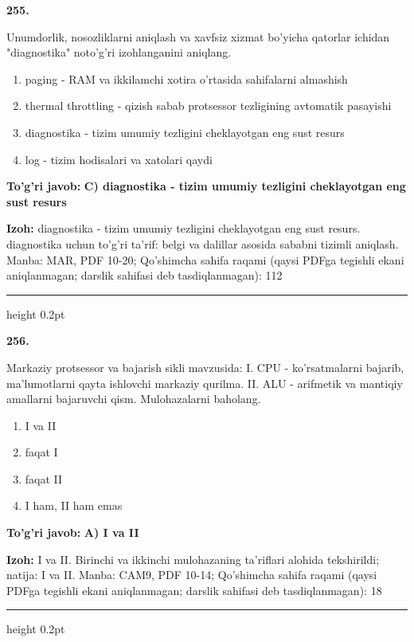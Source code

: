 \documentclass[10pt,a4paper]{article}
\begin{document}
{\bfseries\sffamily\color{ink} 255.}
\par
Unumdorlik, nosozliklarni aniqlash va xavfsiz xizmat bo'yicha qatorlar ichidan "diagnostika" noto'g'ri izohlanganini aniqlang.
\begin{enumerate}[label=\Alph*),leftmargin=9mm]
\item paging - RAM va ikkilamchi xotira o'rtasida sahifalarni almashish
\item thermal throttling - qizish sabab protsessor tezligining avtomatik pasayishi
\item diagnostika - tizim umumiy tezligini cheklayotgan eng sust resurs
\item log - tizim hodisalari va xatolari qaydi
\end{enumerate}
\begin{tcolorbox}[enhanced,breakable,colback=teal!4,colframe=teal!60!black,boxrule=0.45pt,arc=1.2mm,left=2.7mm,right=2.7mm,top=1.8mm,bottom=1.8mm,before skip=2mm,after skip=2mm]
{\bfseries\sffamily\color{teal}To'g'ri javob:} \textbf{C) diagnostika - tizim umumiy tezligini cheklayotgan eng sust resurs}
\par\smallskip
{\bfseries Izoh:} diagnostika - tizim umumiy tezligini cheklayotgan eng sust resurs. diagnostika uchun to'g'ri ta'rif: belgi va dalillar asosida sababni tizimli aniqlash. Manba: MAR, PDF 10-20; Qo'shimcha sahifa raqami (qaysi PDFga tegishli ekani aniqlanmagan; darslik sahifasi deb tasdiqlanmagan): 112
\end{tcolorbox}
\vspace{2mm}\hrule height 0.2pt\vspace{3mm}

{\bfseries\sffamily\color{ink} 256.}
\par
Markaziy protsessor va bajarish sikli mavzusida: I. CPU - ko'rsatmalarni bajarib, ma'lumotlarni qayta ishlovchi markaziy qurilma. II. ALU - arifmetik va mantiqiy amallarni bajaruvchi qism. Mulohazalarni baholang.
\begin{enumerate}[label=\Alph*),leftmargin=9mm]
\item I va II
\item faqat I
\item faqat II
\item I ham, II ham emas
\end{enumerate}
\begin{tcolorbox}[enhanced,breakable,colback=teal!4,colframe=teal!60!black,boxrule=0.45pt,arc=1.2mm,left=2.7mm,right=2.7mm,top=1.8mm,bottom=1.8mm,before skip=2mm,after skip=2mm]
{\bfseries\sffamily\color{teal}To'g'ri javob:} \textbf{A) I va II}
\par\smallskip
{\bfseries Izoh:} I va II. Birinchi va ikkinchi mulohazaning ta'riflari alohida tekshirildi; natija: I va II. Manba: CAM9, PDF 10-14; Qo'shimcha sahifa raqami (qaysi PDFga tegishli ekani aniqlanmagan; darslik sahifasi deb tasdiqlanmagan): 18
\end{tcolorbox}
\vspace{2mm}\hrule height 0.2pt\vspace{3mm}
\end{document}
